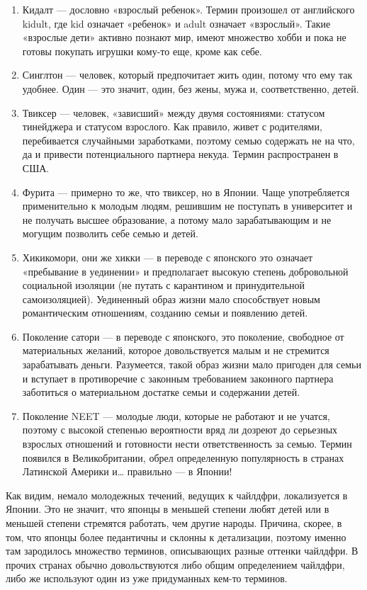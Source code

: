 \begin{enumerate}
    \item Кидалт --- дословно «взрослый ребенок». Термин произошел от английского kidult, где kid означает «ребенок» и adult означает «взрослый». Такие «взрослые дети» активно познают мир, имеют множество хобби и пока не готовы покупать игрушки кому-то еще, кроме как себе.
    \item Синглтон --- человек, который предпочитает жить один, потому что ему так удобнее. Один --- это значит, один, без жены, мужа и, соответственно, детей.
    \item Твиксер --- человек, «зависший» между двумя состояниями: статусом тинейджера и статусом взрослого. Как правило, живет с родителями, перебивается случайными заработками, поэтому семью содержать не на что, да и привести потенциального партнера некуда. Термин распространен в США.
    \item Фурита --- примерно то же, что твиксер, но в Японии. Чаще употребляется применительно к молодым людям, решившим не поступать в университет и не получать высшее образование, а потому мало зарабатывающим и не могущим позволить себе семью и детей.
    \item Хикикомори, они же хикки --- в переводе с японского это означает «пребывание в уединении» и предполагает высокую степень добровольной социальной изоляции (не путать с карантином и принудительной самоизоляцией). Уединенный образ жизни мало способствует новым романтическим отношениям, созданию семьи и появлению детей.
    \item Поколение сатори --- в переводе с японского, это поколение, свободное от материальных желаний, которое довольствуется малым и не стремится зарабатывать деньги. Разумеется, такой образ жизни мало пригоден для семьи и вступает в противоречие с законным требованием законного партнера заботиться о материальном достатке семьи и содержании детей.
    \item Поколение NEET --- молодые люди, которые не работают и не учатся, поэтому с высокой степенью вероятности вряд ли дозреют до серьезных взрослых отношений и готовности нести ответственность за семью. Термин появился в Великобритании, обрел определенную популярность в странах Латинской Америки и… правильно --- в Японии!
\end{enumerate}

Как видим, немало молодежных течений, ведущих к чайлдфри, локализуется в Японии. Это не значит, что японцы в меньшей степени любят детей или в меньшей степени стремятся работать, чем другие народы. Причина, скорее, в том, что японцы более педантичны и склонны к детализации, поэтому именно там зародилось множество терминов, описывающих разные оттенки чайлдфри. В прочих странах обычно довольствуются либо общим определением чайлдфри, либо же используют один из уже придуманных кем-то терминов.

